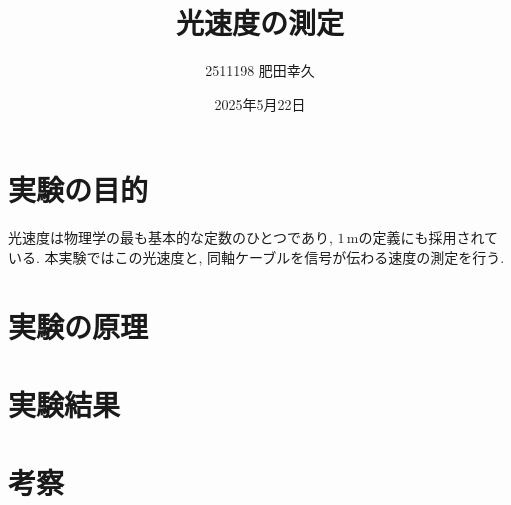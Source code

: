 \documentclass{jarticle}
\title{光速度の測定}
\author{2511198 肥田幸久}
\date{2025年5月22日}
\begin{document}
\maketitle

\section{実験の目的}
光速度は物理学の最も基本的な定数のひとつであり, $1\,\mathrm{m}$の定義にも採用されている. 本実験ではこの光速度と, 同軸ケーブルを信号が伝わる速度の測定を行う.

\section{実験の原理}

\section{実験結果}

\section{考察}


\begin{thebibliography}{99}


\end{thebibliography}
\end{document}

